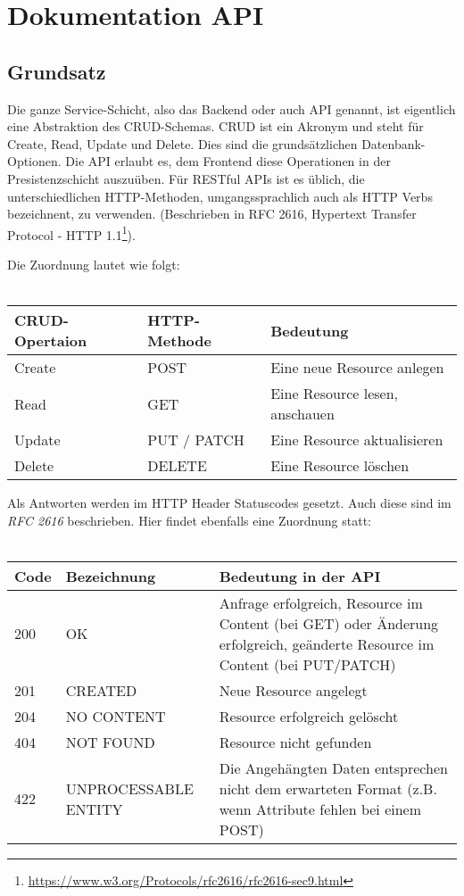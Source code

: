 \chapter{Dokumentation API}
\label{chap:doc-api}
\section{Grundsatz}
Die ganze Service-Schicht, also das Backend oder auch API genannt, ist eigentlich eine Abstraktion des CRUD-Schemas. CRUD ist ein Akronym und steht für Create, Read, Update und Delete. Dies sind die grundsätzlichen Datenbank-Optionen. Die API erlaubt es, dem Frontend diese Operationen in der Presistenzschicht auszuüben. Für RESTful APIs ist es üblich, die unterschiedlichen HTTP-Methoden, umgangssprachlich auch als HTTP Verbs bezeichnent, zu verwenden. (Beschrieben in RFC 2616, Hypertext Transfer Protocol - HTTP 1.1\footnote{\url{https://www.w3.org/Protocols/rfc2616/rfc2616-sec9.html}}).

Die Zuordnung lautet wie folgt: \\\\
\vspace{0.5cm}
\begin{tabular}{|l|l|p{6cm}|}
\hline
\textbf{CRUD-Opertaion} & \textbf{HTTP-Methode} & \textbf{Bedeutung} \\ \hline	
Create & POST & Eine neue Resource anlegen \\ \hline	
Read & GET & Eine Resource lesen, anschauen \\ \hline	
Update & PUT / PATCH & Eine Resource aktualisieren \\ \hline	
Delete & DELETE & Eine Resource löschen \\ \hline	
\end{tabular}
\vspace{0.3cm}

Als Antworten werden im HTTP Header Statuscodes gesetzt. Auch diese sind im \emph{RFC 2616} beschrieben. Hier findet ebenfalls eine Zuordnung statt:\\\\
\begin{tabular}{|l|l|p{9cm}|}
\hline
\textbf{Code} & \textbf{Bezeichnung} & \textbf{Bedeutung in der API} \\ \hline	
200 &	OK	& Anfrage erfolgreich, Resource im Content (bei GET) oder Änderung erfolgreich, geänderte Resource im Content (bei PUT/PATCH)\\ \hline
201 &	CREATED &	Neue Resource angelegt \\ \hline
204 &	NO CONTENT &	Resource erfolgreich gelöscht \\ \hline
404 &	NOT FOUND	& 	Resource nicht gefunden \\ \hline
422 &	UNPROCESSABLE ENTITY	&	Die Angehängten Daten entsprechen nicht dem erwarteten Format (z.B. wenn Attribute fehlen bei einem POST)\\ \hline
\end{tabular}
\vspace{0.3cm}

